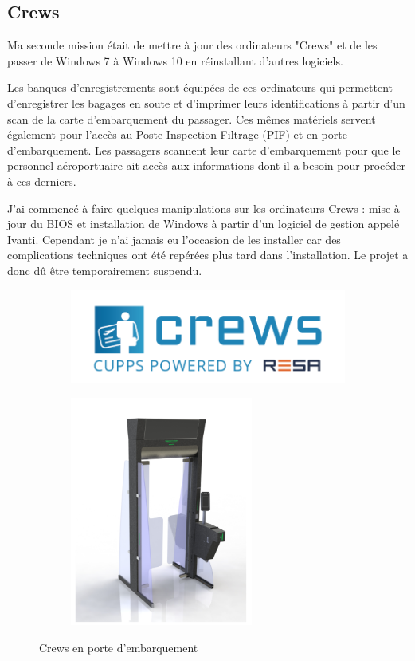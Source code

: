 \newpage


\subsection{Crews}

Ma seconde mission était de mettre à jour des ordinateurs "Crews" et de les passer de Windows 7 à Windows 10 en réinstallant d’autres logiciels.

Les banques d’enregistrements sont équipées de ces ordinateurs qui permettent d’enregistrer les bagages en soute et d’imprimer leurs identifications à partir d’un scan de la carte d’embarquement du passager. Ces mêmes matériels servent également pour l’accès au Poste Inspection Filtrage (PIF) et en porte d’embarquement. Les passagers scannent leur carte d’embarquement pour que le personnel aéroportuaire ait accès aux informations dont il a besoin pour procéder à ces derniers.

J’ai commencé à faire quelques manipulations sur les ordinateurs Crews : mise à jour du BIOS et installation de Windows à partir d’un logiciel de gestion appelé Ivanti. Cependant je n’ai jamais eu l'occasion de les installer car des complications techniques ont été repérées plus tard dans l’installation. Le projet a donc dû être temporairement suspendu.

\begin{figure}[hbt!]
  \begin{subfigure}{0.5\textwidth}
    \centering
    \includegraphics[width=10cm]{Images/logocrews.png}  
    \label{fig:logocrews}
  \end{subfigure}
  \begin{subfigure}{0.5\textwidth}
    \centering
    \includegraphics[width=6cm]{Images/crews2.png}\newline  
    \label{fig:portecrews}
  \end{subfigure}
  \caption{Crews en porte d'embarquement}
\end{figure}


